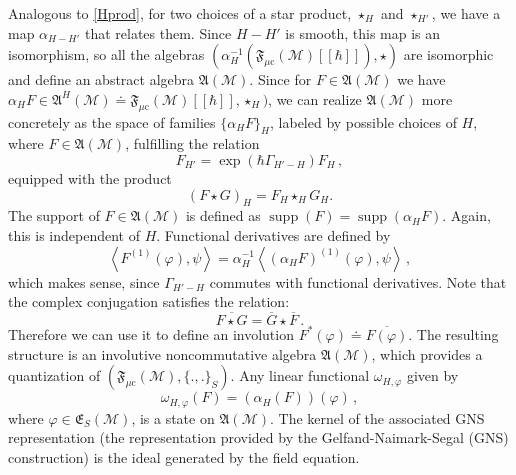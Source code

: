\documentclass[11pt]{article}
\newcommand{\E}{\mathfrak{E}}
\newcommand{\fA}{\mathfrak{A}}
\newcommand{\F}{\mathfrak{F}}
\newcommand{\Mcal}{\mathcal{M}}
\DeclareMathOperator{\supp}{\mathrm{supp}}      %
\newcommand{\mc}{{\mu\mathrm{c}}}
\newcommand{\al}{\alpha}
\newcommand{\ph}{\varphi}
\newcommand{\om}{\omega}
\newcommand{\Poi}[2]{\{#1,#2\}}
\newcommand{\sst}[1]{\scriptscriptstyle{#1}}  %
\newcommand{\1}{\mathds{1}}                         %
\newcommand{\be}{\begin{equation}}
\newcommand{\ee}{\end{equation}}
\begin{document}
{{\begin{exa}
\end{exa}
Analogous to \eqref{Hprod}, for two choices of a star product, $\star_H$ and $\star_{H'}$, we have a map $\al_{H-H'} $ that relates them. Since $H-H'$ is smooth, this map is an isomorphism, so all the algebras $(\al_H^{-1}(\F_\mc(\Mcal)[[\hbar]]),\star)$ are isomorphic and define an abstract algebra $\fA(\Mcal)$. Since for $F \in \fA(\Mcal)$ we have $\al_HF\in \fA^{\sst H}(\Mcal)\doteq\F_{\mc}(\Mcal)[[\hbar]],\star_H)$, we can realize $\fA(\Mcal)$ more concretely as the space of families $\{ \al_HF \}_H$,  labeled by possible choices of $H$, where  $F \in \fA(\Mcal)$, fulfilling the relation
\[
 F_{H'} = \exp(\hbar \Gamma_{H'-H}) F_H\,,
\]
equipped with the product
\[
 (F \star G)_H = F_H \star_H G_H.
\]
The support of $F \in \fA(\Mcal)$ is defined as $\supp(F) = \supp(\al_HF)$. Again, this is independent of $H$. Functional derivatives are defined by
\[
\left<F^{(1)}(\ph),\psi\right> = \al_H^{-1}\left<(\al_HF)^{(1)}(\ph),\psi\right>\,,
\]
which makes sense, since $\Gamma_{H'-H}$ commutes with functional derivatives. Note that the complex conjugation satisfies the relation:
\be
\overline{F\star G}=\overline{G}\star\overline{F}\,.
\ee
Therefore we can use it to define an involution  $F^*(\ph)\doteq\overline{F(\ph)}$. The resulting structure is an involutive noncommutative algebra $\fA(\Mcal)$, which provides a quantization of $(\F_{\mc}(\Mcal),\Poi{.}{.}_S)$. Any linear functional $\omega_{H,\ph}$ given by
 \be\label{vacuum}
 \om_{H,\ph}(F)=(\al_H(F))(\ph)\,,
 \ee 
 where $\ph\in\E_S(\Mcal)$, is a state on $\fA(\Mcal)$. The kernel of the associated GNS representation  (the representation provided by the Gelfand-Naimark-Segal
 (GNS) construction) is the ideal generated by the field equation.

}}
\end{document}
